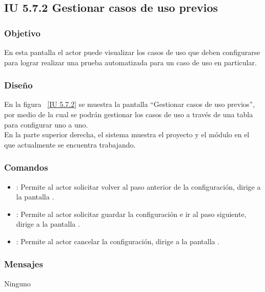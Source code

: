 \newpage 
\subsection{IU 5.7.2 Gestionar casos de uso previos}
\subsubsection{Objetivo}
	
	En esta pantalla el actor puede visualizar los casos de uso que deben configurarse para lograr realizar una prueba automatizada para un caso de uso en particular.

\subsubsection{Diseño}

    En la figura ~\ref{IU 5.7.2} se muestra la pantalla ``Gestionar casos de uso previos'', por medio de la cual 
    se podrán gestionar los casos de uso a través de una tabla para configurar uno a uno.\\
	
	En la parte superior derecha, el sistema muestra el proyecto y el módulo en el que actualmente se encuentra trabajando.




\subsubsection{Comandos}
\begin{itemize}
	\item {}: Permite al actor solicitar volver al paso anterior de la configuración, dirige a la pantalla .
	\item {}: Permite al actor solicitar guardar la configuración e ir al paso siguiente, dirige a la pantalla .
	\item {}: Permite al actor cancelar la configuración, dirige a la pantalla .
	
	
\end{itemize}

\subsubsection{Mensajes}

	
\begin{description}
	\item[Ninguno]
\end{description}
